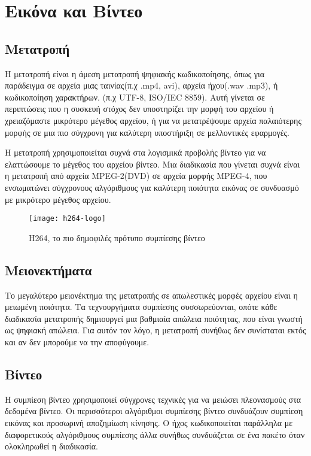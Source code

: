 \section{Εικόνα και Βίντεο}
\subsection{Μετατροπή}
Η μετατροπή είναι η άμεση μετατροπή ψηφιακής κωδικοποίησης, όπως για παράδειγμα σε αρχεία μιας ταινίας(π.χ .mp4, avi), αρχεία ήχου(.wav .mp3), ή κωδικοποίηση χαρακτήρων. (π.χ UTF-8, ISO/IEC 8859). Αυτή γίνεται σε περιπτώσεις που η συσκευή στόχος δεν υποστηρίζει την μορφή του αρχείου ή χρειαζόμαστε μικρότερο μέγεθος αρχείου, ή για να μετατρέψουμε αρχεία παλαιότερης μορφής σε μια πιο σύγχρονη για καλύτερη υποστήριξη σε μελλοντικές εφαρμογές. 

Η μετατροπή χρησιμοποιείται συχνά στα λογισμικά προβολής βίντεο για να ελαττώσουμε το μέγεθος του αρχείου βίντεο. Μια διαδικασία που γίνεται συχνά είναι η μετατροπή από αρχεία MPEG-2(DVD) σε αρχεία μορφής MPEG-4, που ενσωματώνει σύγχρονους αλγόριθμους για καλύτερη ποιότητα εικόνας σε συνδυασμό με μικρότερο μέγεθος αρχείου.

\begin{figure}[h]
\centering
\texttt{[image: h264-logo]}
\caption{H264, το πιο δημοφιλές πρότυπο συμπίεσης βίντεο}
\end{figure}
\subsection{Μειονεκτήματα} 
Το μεγαλύτερο μειονέκτημα της μετατροπής σε απωλεστικές μορφές αρχείου είναι η μειωμένη ποιότητα. Τα τεχνουργήματα συμπίεσης συσσωρεύονται, οπότε κάθε διαδικασία μετατροπής δημιουργεί μια βαθμιαία απώλεια ποιότητας, που είναι γνωστή ως ψηφιακή απώλεια. Για αυτόν τον λόγο, η μετατροπή συνήθως δεν συνίσταται εκτός και αν δεν μπορούμε να την αποφύγουμε.

\subsection{Βίντεο}
H συμπίεση βίντεο χρησιμοποιεί σύγχρονες τεχνικές για να μειώσει πλεονασμούς στα δεδομένα βίντεο. Οι περισσότεροι αλγόριθμοι συμπίεσης βίντεο συνδυάζουν συμπίεση εικόνας και προσωρινή αποζημίωση κίνησης. Ο ήχος κωδικοποιείται παράλληλα με διαφορετικούς αλγόριθμους συμπίεσης άλλα συνήθως συνδυάζεται σε ένα πακέτο όταν ολοκληρωθεί η διαδικασία.

